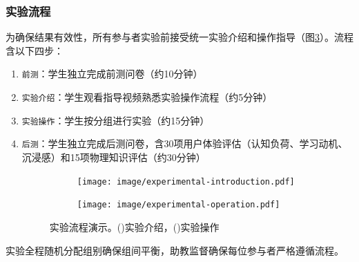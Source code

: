 \documentclass[runningheads]{llncs}
\begin{document}
\subsubsection{实验流程}
为确保结果有效性，所有参与者实验前接受统一实验介绍和操作指导（图\ref{fig:experimental-procedure}）。流程含以下四步：
\begin{enumerate}
\item {\texttt{前测}}：学生独立完成前测问卷（约10分钟）
\item {\texttt{实验介绍}}：学生观看指导视频熟悉实验操作流程（约5分钟）
\item {\texttt{实验操作}}：学生按分组进行实验（约15分钟）
\item {\texttt{后测}}：学生独立完成后测问卷，含30项用户体验评估（认知负荷、学习动机、沉浸感）和15项物理知识评估（约30分钟）

\begin{figure}
  \begin{subfigure}{0.48\linewidth}
    \centering
    \texttt{[image: image/experimental-introduction.pdf]}
    \caption{}
    \label{fig:experimental-introduction}
  \end{subfigure}
  \hfill
  \begin{subfigure}{0.48\linewidth}
    \centering
    \texttt{[image: image/experimental-operation.pdf]}
    \caption{}
    \label{fig:experimental-operation}
  \end{subfigure}
  \caption{实验流程演示。()实验介绍，()实验操作}
  \label{fig:experimental-procedure}
\end{figure}
\end{enumerate}

实验全程随机分配组别确保组间平衡，助教监督确保每位参与者严格遵循流程。
\end{document}
